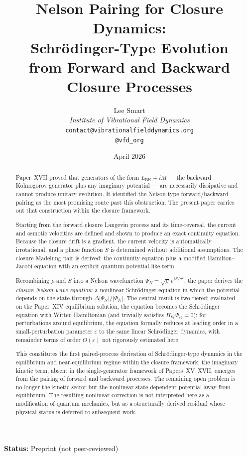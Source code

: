\documentclass[12pt]{article}
\title{Nelson Pairing for Closure Dynamics:\\Schr\"odinger-Type Evolution\\from Forward and Backward Closure Processes}
\author{%
  Lee Smart\\[4pt]
  \textit{Institute of Vibrational Field Dynamics}\\[2pt]
  \texttt{contact@vibrationalfielddynamics.org}\\[2pt]
  \texttt{@vfd\_org}%
}
\date{April 2026}
\begin{document}
\maketitle

\noindent\textbf{Status:} Preprint (not peer-reviewed)

\begin{abstract}
Paper~XVII proved that generators of the form $L_{\mathrm{BK}} + iM$ --- the backward Kolmogorov generator plus any imaginary potential --- are necessarily dissipative and cannot produce unitary evolution. It identified the Nelson-type forward/backward pairing as the most promising route past this obstruction. The present paper carries out that construction within the closure framework.

Starting from the forward closure Langevin process and its time-reversal, the current and osmotic velocities are defined and shown to produce an exact continuity equation. Because the closure drift is a gradient, the current velocity is automatically irrotational, and a phase function $S$ is determined without additional assumptions. The closure Madelung pair is derived: the continuity equation plus a modified Hamilton--Jacobi equation with an explicit quantum-potential-like term.

Recombining $\rho$ and $S$ into a Nelson wavefunction $\Psi_N = \sqrt{\rho}\,e^{iS/\sigma^2}$, the paper derives the \textit{closure-Nelson wave equation}: a nonlinear Schr\"odinger equation in which the potential depends on the state through $\Delta|\Psi_N|/|\Psi_N|$. The central result is two-tiered: evaluated on the Paper~XIV equilibrium solution, the equation becomes the Schr\"odinger equation with Witten Hamiltonian (and trivially satisfies $H_{\mathrm{W}}\Psi_{\mathrm{st}} = 0$); for perturbations around equilibrium, the equation formally reduces at leading order in a small-perturbation parameter $\varepsilon$ to the same linear Schr\"odinger dynamics, with remainder terms of order $O(\varepsilon)$ not rigorously estimated here.

This constitutes the first paired-process derivation of Schr\"odinger-type dynamics in the equilibrium and near-equilibrium regime within the closure framework: the imaginary kinetic term, absent in the single-generator framework of Papers~XV--XVII, emerges from the pairing of forward and backward processes. The remaining open problem is no longer the kinetic sector but the nonlinear state-dependent potential away from equilibrium. The resulting nonlinear correction is not interpreted here as a modification of quantum mechanics, but as a structurally derived residual whose physical status is deferred to subsequent work.
\end{abstract}
\end{document}
